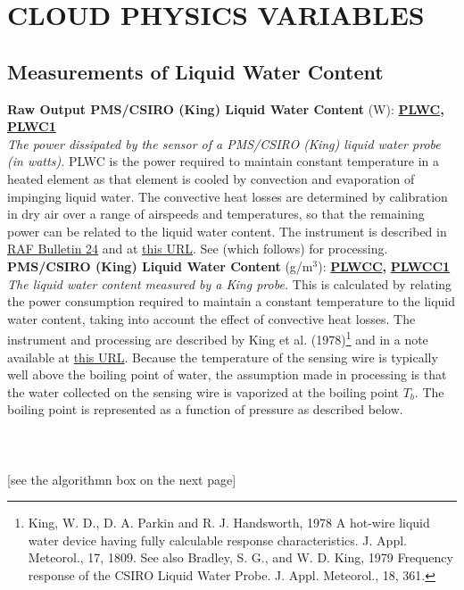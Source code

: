 
\section{CLOUD PHYSICS VARIABLES}

\subsection{Measurements of Liquid Water Content}
\begin{hangparagraphs}
\textbf{Raw Output PMS/CSIRO (King) Liquid Water Content} (W):\hypertarget{PLWC}{}\hypertarget{PLWC1}{}\textbf{
}\textbf{\uline{PLWC}}\textbf{,
}\textbf{\uline{PLWC1}}\label{punch:5-3}\\
\emph{The power dissipated by the sensor of a PMS/CSIRO
(King) liquid water probe (in watts).
}PLWC is the power required to maintain constant temperature in a
heated element as that element is cooled by convection and evaporation
of impinging liquid water. The convective heat losses are determined
by calibration in dry air over a range of airspeeds and temperatures,
so that the remaining power can be related to the liquid water content.
The instrument is described in \href{http://www.eol.ucar.edu/raf/Bulletins/bulletin24.html}{RAF Bulletin 24}
and at \href{http://www.eol.ucar.edu/instruments/king-csiro-liquid-water-sensor}{this URL}.
See  (which follows) for processing.\\

\textbf{\label{PLWCC}PMS/CSIRO (King) Liquid Water Content} (g/m$^{3}$):\hypertarget{PLWCC}{}\hypertarget{PLWCC1}{}\textbf{
}\textbf{\uline{PLWCC}}\textbf{,
}\textbf{\uline{PLWCC1}}\\
\emph{The liquid water content}
\emph{measured by a King probe.} This is calculated by relating the
power consumption required to maintain a constant temperature to the
liquid water content, taking into account the effect of convective
heat losses. The instrument and processing are described by King et
al. (1978)\footnote{King, W. D., D. A. Parkin and R. J. Handsworth, 1978 A hot-wire liquid
water device having fully calculable response characteristics. J.
Appl. Meteorol., 17, 1809. See also Bradley, S. G.,
and W. D. King, 1979 Frequency response of the CSIRO Liquid Water
Probe. J. Appl. Meteorol., 18, 361.} and in a note available at \href{https://drive.google.com/open?id=0B1kIUH45ca5AUkFDWmRwci12eVU}{this URL}.
Because the temperature of the sensing wire is typically well above
the boiling point of water, the assumption
made in processing is that the water collected on the sensing wire
is vaporized at the boiling point $T_{b}$. The boiling point is represented
as a function of pressure as described below. \\
\\
\\
\\
{[}see the algorithmn box on the next page{]}\\
\vfill


\end{hangparagraphs}
